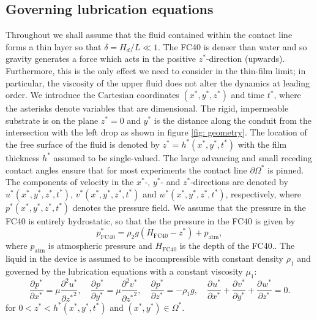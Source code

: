 \documentclass{jfm}
\newcommand{\pD}[3]{\frac{ \partial^{#3} {#1} }{ \partial {#2}^{#3} }}
\begin{document}
\subsection{Governing lubrication equations}

Throughout we shall assume that the fluid contained within the contact line   forms a thin layer so that $\delta = H_d /L \ll1$.
The FC40  is denser than water and so gravity generates a force which acts in the positive ${z^*}$-direction (upwards).
Furthermore,  this is the only effect we need to consider in the thin-film limit; in particular,  the viscosity of the upper fluid does not alter the dynamics at leading order. 
We introduce the Cartesian coordinates $({x^*},{y^*},{z^*})$ and time $t^*$, where the  asterisks    denote variables that are  dimensional.
The  rigid, impermeable substrate is on the  plane  ${z^*}=0$ and   ${y^*}$ is the distance along the  conduit from the intersection with the  left drop as shown in {f}igure \ref{fig: geometry}.
The location of the free surface of the fluid  is denoted by  ${z^*}= {h^*}({x^*},{y^*},{t^*})$ with  the film thickness $h^*$  assumed to be single-valued.
The large advancing and small receding contact angles ensure that   for most experiments the contact line $\partial \Omega^*$ is pinned. 
The components of velocity in the ${x^*}$-, ${y^*}$-  and ${z^*}$-directions are denoted by ${u^*}({x^*},{y^*},{z^*},{t^*})$,  ${v^*}({x^*},{y^*},{z^*},{t^*})$ and   ${w^*}({x^*},{y^*},{z^*},{t^*})$, respectively,   where ${p^*}({x^*},{y^*},{z^*},{t^*})$ denotes the pressure field.
We assume that the pressure in the FC40 is entirely   hydrostatic, so that the the pressure in the FC40 is given by 
\begin{equation}
    p^*_{\text{FC40}} = \rho_2 g \left(H_{\text{FC40}}- z^* \right) +p_{\text{atm}},
\end{equation} 
where $p_{\text{atm}}$ is  atmospheric pressure and $H_{\text{FC40}}$ is the depth of the FC40..
The liquid   in the device  is assumed to be incompressible with constant density $\rho_1$ and   governed by the lubrication 
equations with a constant viscosity $\mu_1$:
 \label{eqn: thin-film dimensional}
\begin{equation}
\pD{{p^*}}{{x^*}}{}=\mu \pD{{u^*}}{{z^*}}{2}, \quad  \pD{{p^*}}{{y^*}}{}=\mu \pD{{v^*}}{{z^*}}{2} , \quad \pD{{p^*}}{{z^*}}{} = -\rho_1 g , \quad \pD{{u^*}}{{x^*}}{}  +  \pD{{v^*}}{{y^*}}{}  +  \pD{{w^*}}{{z^*}}{} =0. 
\tag{\theequation a--d}
\end{equation}
for $ 0<{z^*}<{h^*}({x^*},{y^*},{t^*})$ and $({x^*}, {y^*}) \in \Omega^*$. 
\end{document}
